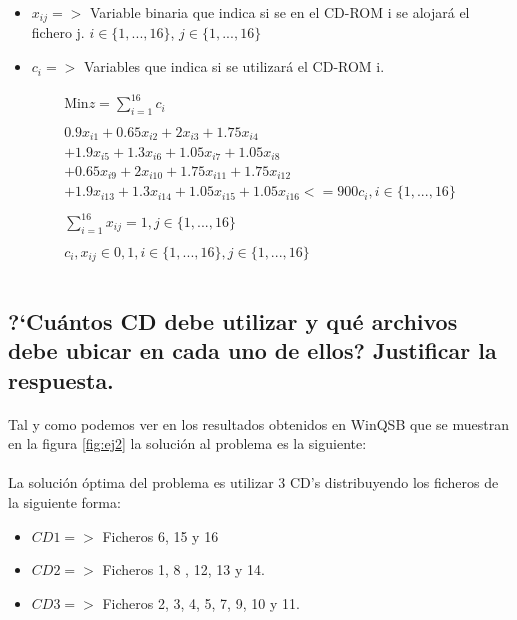 \documentclass[10pt, a4paper]{article}
\begin{document}
			\begin{itemize}

				\item \(x_{ij} => \) Variable binaria que indica si se en el CD-ROM i se alojará el fichero j.  $i \in \{1,...,16\}$, $j \in \{1,...,16\}$

				\item \(c_{i} => \) Variables que indica si se utilizará el CD-ROM i.
			\end{itemize}

			\[
				\begin{split}
					\text{Min} z = \sum_{i=1}^{16} c_{i} \\ \\
						0.9x_{i1} + 0.65x_{i2} + 2x_{i3} + 1.75x_{i4} \\
						+ 1.9x_{i5} + 1.3x_{i6} + 1.05 x_{i7} + 1.05 x_{i8} \\
						+ 0.65x_{i9} + 2x_{i10} + 1.75x_{i11}  + 1.75x_{i12}\\
						+ 1.9x_{i13} + 1.3x_{i14} + 1.05 x_{i15} + 1.05 x_{i16} <= 900c_{i}, i \in \{1,...,16\}\\ \\
					 	\sum_{i=1}^{16} x_{ij} = 1, j \in \{1,...,16\}\\ \\
						c_{i}, x_{ij} \in {0,1}, i \in \{1,...,16\},j \in \{1,...,16\}\\ \\
				\end{split}
			\]
		\subsection{?`Cuántos CD debe utilizar y qué archivos debe ubicar en cada uno de ellos? Justificar la respuesta.}

			\paragraph{}
			Tal y como podemos ver en los resultados obtenidos en WinQSB que se muestran en la figura \ref{fig:ej2} la solución al problema es la siguiente:

			\paragraph{}
			La solución óptima del problema es utilizar 3 CD's distribuyendo los ficheros de la siguiente forma:

			\begin{itemize}

				\item \(CD1 =>\) Ficheros 6, 15 y 16

				\item \(CD2 =>\) Ficheros 1, 8 , 12, 13 y 14.

				\item \(CD3 =>\) Ficheros 2, 3, 4, 5, 7, 9, 10 y 11.
			\end{itemize}
\end{document}

